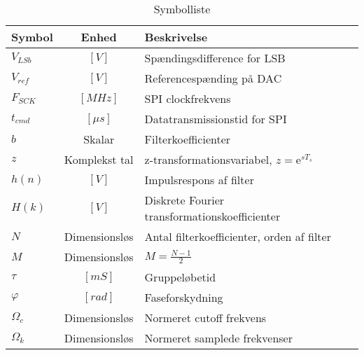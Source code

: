 \begin{table}[ht!]
	\caption{Symbolliste}
	\label{tab:symbolliste2}
	\begin{threeparttable}
		\begin{tabular}{l c p{}}
			\toprule
			\textbf{Symbol}      &
			\textbf{Enhed} & \textbf{Beskrivelse} \\
			\midrule
			$V_{LSb}$ & $\left[\si{V}\right]$ & Spændingsdifference for LSB\\
			$V_{ref}$ & $\left[\si{V}\right]$ & Referencespænding på DAC\\
			$F_{SCK}$ & $\left[\si{MHz}\right]$ & SPI clockfrekvens\\
			$t_{cmd}$ & $\left[\si{\mu s}\right]$ & Datatransmissionstid for SPI\\	
			$b$ & Skalar & Filterkoefficienter \\
			$z$ & Komplekst tal & z-transformationsvariabel, $z = \mathrm{e}^{sT_s}$\\
			$h(n)$ & $\left[\si{V}\right]$ & Impulsrespons af filter \\
			$H(k)$ & $\left[\si{V}\right]$ & Diskrete Fourier transformationskoefficienter\\
			$N$ & Dimensionsløs & Antal filterkoefficienter, orden af filter\\
			$M$ & Dimensionsløs & $M = \frac{N - 1}{2}$\\
			$\tau$ & $\left[\si{mS}\right]$ & Gruppeløbetid\\
			$\varphi$ & $\left[\si{rad}\right]$ & Faseforskydning\\
			$\Omega_c$ & Dimensionsløs & Normeret cutoff frekvens\\
			$\Omega_k$ & Dimensionsløs & Normeret samplede frekvenser\\		
			
		\end{tabular}
	\end{threeparttable}
\end{table}

